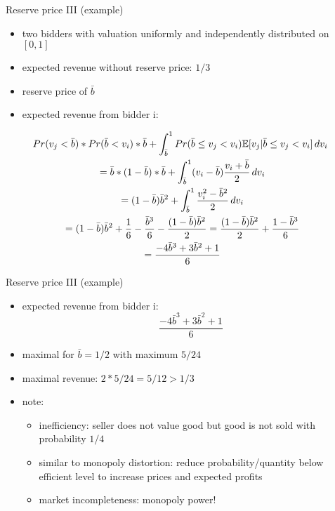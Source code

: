 \documentclass[bigger]{beamer}
\begin{document}
\begin{frame}[label={sec:org9f4b548}]{Reserve price III (example)}
\begin{itemize}
\item two bidders with valuation uniformly and independently distributed on \([0,1]\)
\item expected revenue without reserve price: \(1/3\)
\item reserve price of \(\bar b\)
\item expected revenue from bidder i:
\end{itemize}
\begin{multline*}
\hspace*{-0.15cm}Pr(v_j<\bar b)*Pr(\bar b<v_i)*\bar b+\int_{\bar b}^1 Pr(\bar b\leq v_j<v_i)\mathbb{E}[v_j|\bar b\leq v_j<v_i]\,dv_i\\
=\bar b*(1-\bar b)*\bar b+\int_{\bar b}^1 (v_i-\bar b)\frac{v_i+\bar b}{2}\, dv_i\\
= (1-\bar b)\bar b^2+\int_{\bar b}^1\frac{v_i^2-\bar b^2}{2}\,dv_i\\
= (1-\bar b)\bar b^2+ \frac{1}{6}-\frac{\bar b^3}{6}-\frac{(1-\bar b)\bar b^2}{2}=\frac{(1-\bar b)\bar b^2}{2}+\frac{1-\bar b^3}{6}\\
=\frac{-4\bar b^3+3\bar b^2+1}{6}
\end{multline*}
\end{frame}
\begin{frame}[label={sec:org4cacff0}]{Reserve price III (example)}
\begin{itemize}
\item expected revenue from bidder i:
$$\frac{-4\bar b^3+3\bar b^2+1}{6}$$
\item maximal for \(\bar b=1/2\) with maximum \(5/24\)
\item maximal revenue: \(2*5/24=5/12>1/3\)
\item note:
\begin{itemize}
\item inefficiency: seller does not value good but good is not sold with probability \(1/4\)
\item similar to monopoly distortion: reduce probability/quantity below efficient level to increase prices and expected profits
\item market incompleteness: monopoly power!
\end{itemize}
\end{itemize}
\end{frame}
\end{document}
